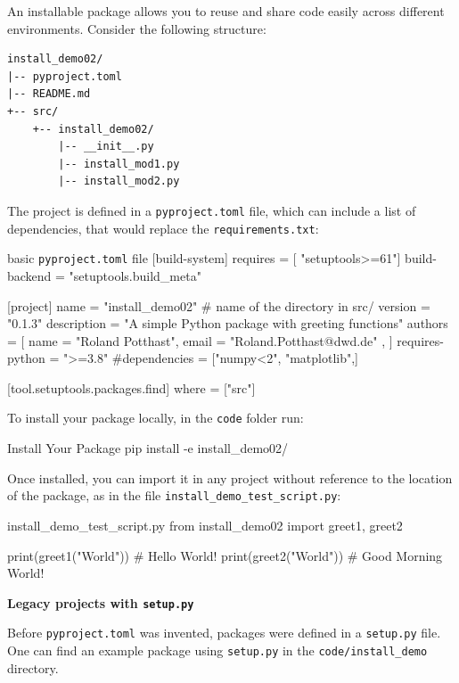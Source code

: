 An installable package allows you to reuse and share code easily across different environments. Consider the following structure:

\begin{lstlisting}[basicstyle=\ttfamily\small]
install_demo02/
|-- pyproject.toml
|-- README.md
+-- src/
    +-- install_demo02/
        |-- __init__.py
        |-- install_mod1.py
        |-- install_mod2.py

\end{lstlisting}

The project is defined in a \texttt{pyproject.toml} file, which can include a list of dependencies, that would replace the \texttt{requirements.txt}:

\begin{codeonly}{basic \texttt{pyproject.toml} file}
[build-system]
requires = [ "setuptools>=61"]
build-backend = "setuptools.build_meta"

[project]
name = "install_demo02"   # name of the directory in src/
version = "0.1.3"
description = "A simple Python package with greeting functions"
authors = [
  { name = "Roland Potthast", email = "Roland.Potthast@dwd.de" },
]
requires-python = ">=3.8"
#dependencies = ["numpy<2", "matplotlib",]

[tool.setuptools.packages.find]
where = ["src"]
\end{codeonly}

To install your package locally, in the \texttt{code} folder run:

\begin{codeonly}{Install Your Package}
pip install -e install_demo02/
\end{codeonly}

Once installed, you can import it in any project without reference to the location of the package, as in the file
\texttt{install\_demo\_test\_script.py}: 

\begin{codeonly}{install\_demo\_test\_script.py}
from install_demo02 import greet1, greet2

print(greet1("World"))  # Hello World!
print(greet2("World"))  # Good Morning World!
\end{codeonly}

\textbf{Legacy projects with \texttt{setup.py}}

Before \texttt{pyproject.toml} was invented, packages were defined in a \texttt{setup.py} file.
One can find an example package using \texttt{setup.py} in the \texttt{code/install\_demo} directory.

